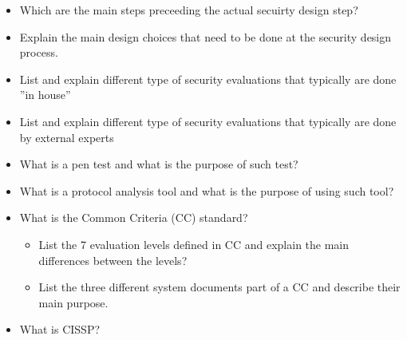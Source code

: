 \begin{itemize}
\item Which are the main steps preceeding the actual secuirty design step?
\item Explain the main design choices that need to be done at the security design process.
\item List and explain different type of security evaluations that typically are done ”in house”
\item List and explain different type of security evaluations that typically are done by external experts
\item What is a pen test and what is the purpose of such test?
\item What is a protocol analysis tool and what is the purpose of using such tool?
\item What is the Common Criteria (CC) standard?
  \begin{itemize}[noitemsep]
  \item List the 7 evaluation levels defined in CC and explain the main differences between the levels?
  \item List the three different system documents part of a CC and describe their main purpose.
  \end{itemize}
\item What is CISSP?\@
\end{itemize}

